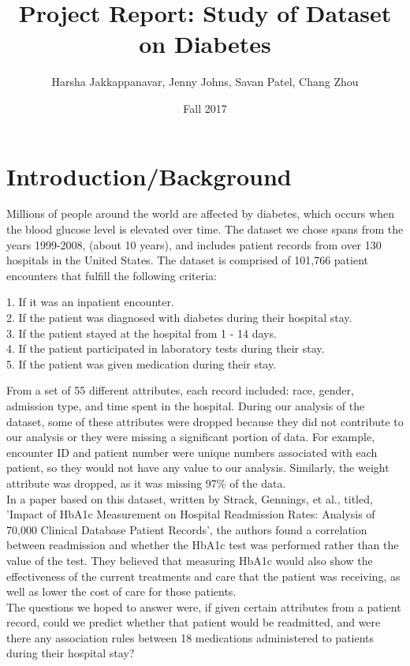 \documentclass{neu_handout}
\title{Project Report: Study of Dataset on Diabetes}
\author{Harsha Jakkappanavar, Jenny Johns, Savan Patel, Chang Zhou}
\date{Fall 2017}
\begin{document}
\section*{Introduction/Background}

Millions of people around the world are affected by diabetes, which occurs when the blood glucose level is elevated over time. The dataset we chose spans from the years 1999-2008, (about 10 years), and includes patient records from over 130 hospitals in the United States. The dataset is comprised of 101,766 patient encounters that fulfill the following criteria: \\

\begin{adjustwidth}{2cm}{}
 1. If it was an inpatient encounter. \\
 2. If the patient was diagnosed with diabetes during their hospital stay. \\
 3. If the patient stayed at the hospital from 1 - 14 days. \\
 4. If the patient participated in laboratory tests during their stay. \\
 5. If the patient was given medication during their stay. \\
 \end{adjustwidth}
 
From a set of 55 different attributes, each record included: race, gender, admission type, and time spent in the hospital. During our analysis of the dataset, some of these attributes were dropped because they did not contribute to our analysis or they were missing a significant portion of data. For example, encounter ID and patient number were unique numbers associated with each patient, so they would not have any value to our analysis. Similarly, the weight attribute was dropped, as it was missing 97\% of the data. \\
 
In a paper based on this dataset, written by Strack, Gennings, et al., titled, 'Impact of HbA1c Measurement on Hospital Readmission Rates: Analysis of 70,000 Clinical Database Patient Records', the authors found a correlation between readmission and whether the HbA1c test was performed rather than the value of the test. They believed that measuring HbA1c would also show the effectiveness of the current treatments and care that the patient was receiving, as well as lower the cost of care for those patients. \\

The questions we hoped to answer were, if given certain attributes from a patient record, could we predict whether that patient would be readmitted, and were there any association rules between 18 medications administered to patients during their hospital stay?
\end{document}
